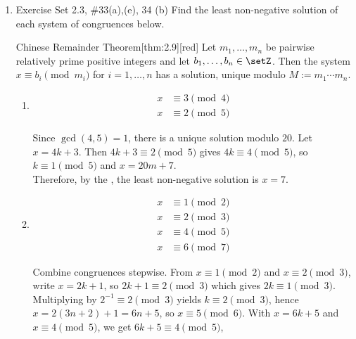 \begin{enumerate}
\newpage
\item Exercise Set 2.3, \#33(a),(e), 34 (b) 
Find the least non-negative solution of each system of congruences below.
\begin{define}{Chinese Remainder Theorem}[thm:2.9][red]
  Let $m_1,\dots,m_n$ be pairwise relatively prime positive integers and let $b_1,\dots,b_n\in\setZ$.
  Then the system $x\equiv b_i\pmod{m_i}$ for $i=1,\dots,n$ has a solution, unique modulo $M:=m_1\cdots m_n$.
\end{define}
\begin{enumerate}
  \item 
  \begin{align*}
  x & \equiv 3 \pmod{4} \\
  x & \equiv 2 \pmod{5}
  \end{align*}
  \begin{subanswer}
    Since $\gcd(4,5)=1$, there is a unique solution modulo $20$. Let $x=4k+3$. 
    Then $4k+3\equiv 2\pmod{5}$ gives $4k\equiv 4\pmod{5}$, so $k\equiv 1\pmod{5}$ 
    and $x=20m+7$.\vspace*{10px}\\
    Therefore, by the , the least non-negative solution is $x=7$.
  \end{subanswer}
  \item 
  \begin{align*}
  x & \equiv 1 \pmod{2} \\
  x & \equiv 2 \pmod{3} \\
  x & \equiv 4 \pmod{5} \\
  x & \equiv 6 \pmod{7} 
  \end{align*}
  \begin{subanswer}
    Combine congruences stepwise. From $x\equiv 1\pmod{2}$ and $x\equiv 2\pmod{3}$, 
    write $x=2k+1$, so $2k+1\equiv 2\pmod{3}$ which gives $2k\equiv 1\pmod{3}$. 
    Multiplying by $2^{-1}\equiv 2\pmod{3}$ yields $k\equiv 2\pmod{3}$, 
    hence $x=2(3n+2)+1=6n+5$, so $x\equiv 5\pmod{6}$. 
    With $x=6k+5$ and $x\equiv 4\pmod{5}$, we get $6k+5\equiv 4\pmod{5}$, 

\end{subanswer}
\end{enumerate}
\end{enumerate}
